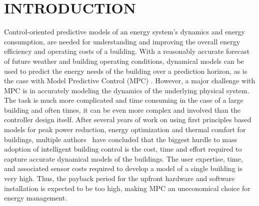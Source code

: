 \section{INTRODUCTION}
\label{S:intro}

\textcolor[rgb]{0,0,1}{Control-oriented predictive models of an energy system's dynamics and energy consumption, are needed for understanding and improving the overall energy efficiency and operating costs of a building.
With a reasonably accurate forecast of future weather and building operating conditions, dynamical models can be used to predict the energy needs of the building over a prediction horizon, as is the case with Model Predictive Control (MPC) \cite{Sturzenegger2016}.
However, a major challenge with MPC is in accurately modeling the dynamics of the underlying physical system.
The task is much more complicated and time consuming in the case of a large building and often times, it can be even more complex and involved than the controller design itself.
After several years of work on using first principles based models for peak power reduction, energy optimization and thermal comfort for buildings, multiple authors~\cite{Sturzenegger2016, vzavcekova2014} have concluded that the biggest hurdle to mass adoption of intelligent building control is the cost, time and effort required to capture accurate dynamical models of the buildings.
The user expertise, time, and associated sensor costs required to develop a model of a single building is very high. Thus, the payback period for the upfront hardware and software installation is expected to be too high, making MPC an uneconomical choice for energy management.}

